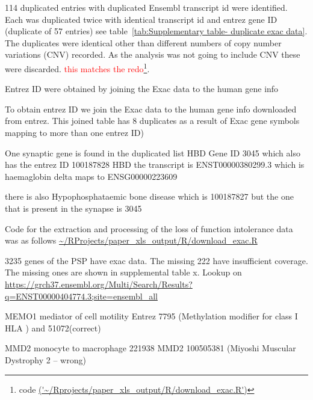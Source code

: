 114 duplicated entries with duplicated Ensembl transcript id were identified. Each was duplicated twice with identical transcript id and entrez gene ID (duplicate of 57 entries) see table~\ref{tab:Supplementary table- duplicate exac data}. The duplicates were identical other than different numbers of copy number variations (CNV) recorded. As the analysis was not going to include CNV these were discarded.  \textcolor{red}{this matches the redo}\footnote{code \url{('~/Rprojects/paper_xls_output/R/download_exac.R')}}.


Entrez ID were obtained by joining the Exac data to the human gene info 




To obtain entrez ID we join the Exac data to the human gene info downloaded from entrez. This joined table has 8 duplicates as a result of Exac gene symbols mapping to more than one entrez ID)

One synaptic gene is found in the duplicated list HBD Gene ID 3045 which also has the entrez ID 100187828 
HBD
the transcript is ENST00000380299.3 which is haemaglobin delta maps to ENSG00000223609

there is also Hypophosphataemic bone disease which is 100187827 but the one that is present in the synapse is 3045


Code for the extraction and processing of the loss of function intolerance data was as follows 
\url{~/RProjects/paper_xls_output/R/download_exac.R}

3235 genes of the PSP have exac data. The missing 222 have insufficient coverage. The missing ones are shown in supplemental table x.
Lookup on \url{https://grch37.ensembl.org/Multi/Search/Results?q=ENST00000404774.3;site=ensembl_all}

MEMO1 mediator of cell motility Entrez 7795 (Methylation modifier for class I HLA
) and 51072(correct)

MMD2 monocyte to macrophage 221938 MMD2 100505381 (Miyoshi Muscular Dystrophy 2 – wrong)

